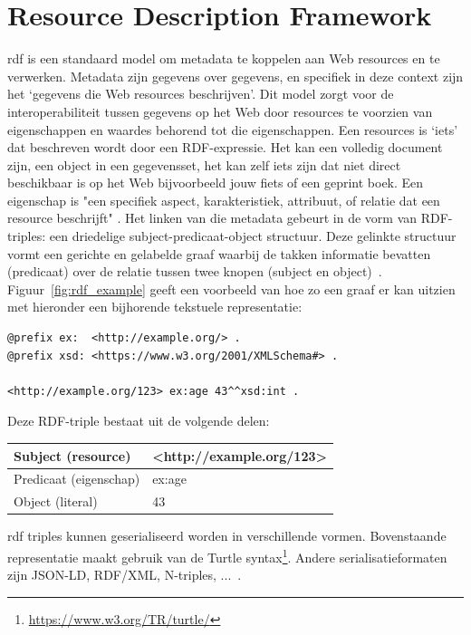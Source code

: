 \section{Resource Description Framework}
\label{sec:rdf}
\acrfull{rdf} is een standaard model om metadata te koppelen aan Web resources en te verwerken. Metadata zijn gegevens over gegevens, en specifiek in deze context zijn het `gegevens die Web resources beschrijven'. Dit model zorgt voor de interoperabiliteit tussen gegevens op het Web door resources te voorzien van eigenschappen en waardes behorend tot die eigenschappen. Een resources is `iets' dat beschreven wordt door een RDF-expressie. Het kan een volledig document zijn, een object in een gegevensset, het kan zelf iets zijn dat niet direct beschikbaar is op het Web bijvoorbeeld jouw fiets of een geprint boek. Een eigenschap is "een specifiek aspect, karakteristiek, attribuut, of relatie dat een resource beschrijft" \cite{rdf}.
Het linken van die metadata gebeurt in de vorm van RDF-triples: een driedelige subject-predicaat-object structuur. Deze gelinkte structuur vormt een gerichte en gelabelde graaf waarbij de takken informatie bevatten (predicaat) over de relatie tussen twee knopen (subject en object)~\cite{rdf_triple}. 
Figuur~\ref{fig:rdf_example} geeft een voorbeeld van hoe zo een graaf er kan uitzien met hieronder een bijhorende tekstuele representatie:

\begin{code}
\begin{verbatim}
@prefix ex:  <http://example.org/> .
@prefix xsd: <https://www.w3.org/2001/XMLSchema#> .

<http://example.org/123> ex:age 43^^xsd:int .
\end{verbatim}
\caption{RDF-triple in turtle formaat}
\label{code:rdftriple}
\end{code}

Deze RDF-triple bestaat uit de volgende delen:
\begin{table}[h]
\begin{tabular}{|l|l|}
    \hline
    Subject (resource) & <http://example.org/123>\\
    \hline
    Predicaat (eigenschap) & ex:age\\
    \hline
    Object (literal) & 43\\
    \hline
\end{tabular}
\end{table}

\acrshort{rdf} triples kunnen geserialiseerd worden in verschillende vormen. Bovenstaande representatie maakt gebruik van de Turtle syntax\footnote{\url{https://www.w3.org/TR/turtle/}}. Andere serialisatieformaten zijn JSON-LD, RDF/XML, N-triples, ...~\cite{publishingLD}.

